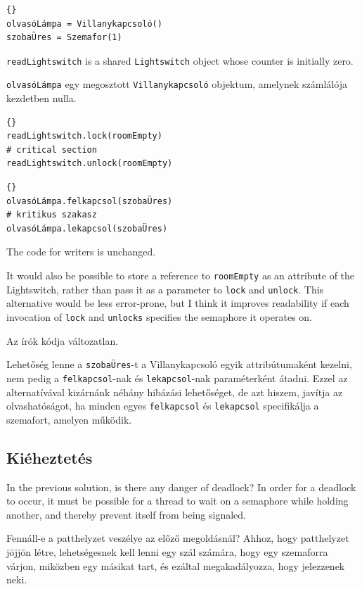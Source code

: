 \documentclass{book}
\begin{document}
\begin{lstlisting}[title={Írók-olvasók inicializáció}]{}
olvasóLámpa = Villanykapcsoló()
szobaÜres = Szemafor(1)
\end{lstlisting}

{\tt readLightswitch} is a shared {\tt Lightswitch} object whose counter
is initially zero.

{\tt olvasóLámpa} egy megosztott {\tt Villanykapcsoló} objektum,
amelynek számlálója kezdetben nulla.

\begin{lstlisting}[title={Readers-writers solution (reader)}]{}
readLightswitch.lock(roomEmpty)
# critical section
readLightswitch.unlock(roomEmpty)
\end{lstlisting}

\begin{lstlisting}[title={Írók-olvasók megoldás (olvasók)}]{}
olvasóLámpa.felkapcsol(szobaÜres)
# kritikus szakasz
olvasóLámpa.lekapcsol(szobaÜres)
\end{lstlisting}

The code for writers is unchanged.

It would also be possible to store a reference to {\tt roomEmpty}
as an attribute of the Lightswitch, rather than pass it as a parameter
to {\tt lock} and {\tt unlock}.  This alternative would be less
error-prone, but I think it improves readability if each invocation
of {\tt lock} and {\tt unlocks} specifies the semaphore it operates on.

Az írók kódja változatlan.

Lehetőség lenne a {\tt szobaÜres}-t a Villanykapcsoló
egyik attribútumaként kezelni, nem pedig a {\tt felkapcsol}-nak és {\tt lekapcsol}-nak
paraméterként átadni. Ezzel az alternatívával
kizárnánk néhány hibázási lehetőséget, de azt hiszem, javítja az olvashatóságot,
ha minden egyes {\tt felkapcsol} és {\tt lekapcsol} specifikálja a szemafort,
amelyen működik.

\subsection{Kiéheztetés}

In the previous solution, is there any danger of deadlock?
In order for a deadlock to occur, it must be possible for a
thread to wait on a semaphore while holding another, and thereby
prevent itself from being signaled.

Fennáll-e a patthelyzet veszélye az előző megoldásnál? Ahhoz,
hogy patthelyzet jöjjön létre, lehetségesnek kell lenni egy szál számára,
hogy egy szemaforra várjon, miközben egy másikat tart, és ezáltal
megakadályozza, hogy jelezzenek neki.
\end{document}
